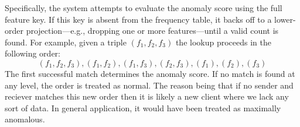 Specifically, the system attempts to evaluate the anomaly score using the full feature key. If this key is absent from the frequency table, it backs off to a lower-order projection—e.g., dropping one or more features—until a valid count is found. For example, given a triple $(f_1, f_2, f_3)$ the lookup proceeds in the following order:
$$
(f_1, f_2, f_3), (f_1, f_2), (f_1, f_3), (f_2, f_3), (f_1), (f_2), (f_3)
$$
The first successful match determines the anomaly score. If no match is found at any level, the order is treated as normal. The reason being that if no sender and reciever matches this new order then it is likely a new client where we lack any sort of data. In general application, it would have been treated as maximally anomalous.

